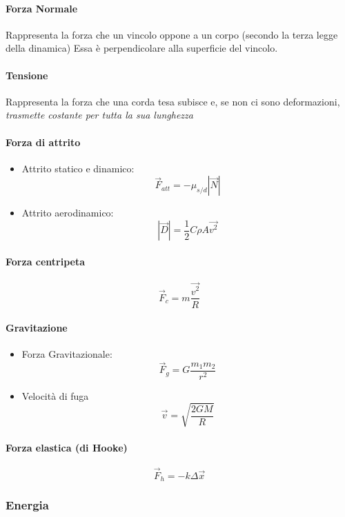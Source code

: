 \documentclass[12pt]{article}
\begin{document}
            \paragraph*{Forza Normale}
            Rappresenta la forza che un vincolo oppone a un corpo (secondo la terza legge della dinamica)
            Essa è perpendicolare alla superficie del vincolo.
            \paragraph*{Tensione}
            Rappresenta la forza che una corda tesa subisce e, se non ci sono deformazioni, \emph{trasmette costante per tutta la sua lunghezza}
            \paragraph*{Forza di attrito}
            \begin{itemize}
                \item Attrito statico e dinamico: \[\vec{F}_{att} = - \mu_{s/d}|\vec{N}|\]
                \item Attrito aerodinamico: \[|\vec{D}| = \frac{1}{2}C\rho A\vec{v^2}\]
            \end{itemize}
            \paragraph*{Forza centripeta}
            \[\vec{F}_c = m\frac{\vec{v^2}}{R}\]
            \paragraph*{Gravitazione}
            \begin{itemize}
                \item Forza Gravitazionale:
                \[\vec{F}_g = G\frac{m_1 m_2}{r^2}\]
                \item Velocità di fuga
                \[\vec{v} = \sqrt{\frac{2GM}{R}}\]
            \end{itemize}
            \paragraph*{Forza elastica (di Hooke)}
            \[\vec{F}_h = -k\Delta \vec{x}\]
        \subsubsection{Energia}
\end{document}
